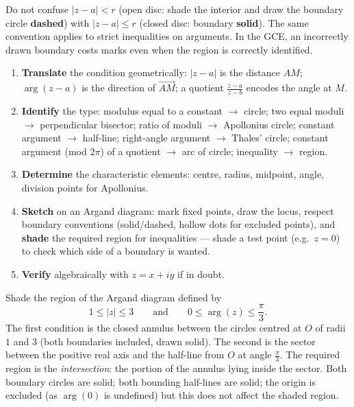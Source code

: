 \documentclass[11pt]{article}
\begin{document}
\begin{attention}
Do not confuse $|z - a| < r$ (open disc: shade the interior and draw the boundary circle \textbf{dashed}) with $|z - a| \leq r$ (closed disc: boundary \textbf{solid}). The same convention applies to strict inequalities on arguments. In the GCE, an incorrectly drawn boundary costs marks even when the region is correctly identified.
\end{attention}

\begin{methode}
\begin{enumerate}
\item \textbf{Translate} the condition geometrically: $|z - a|$ is the distance $AM$; $\arg(z - a)$ is the direction of $\overrightarrow{AM}$; a quotient $\tfrac{z - a}{z - b}$ encodes the angle at $M$.
\item \textbf{Identify} the type: modulus equal to a constant $\to$ circle; two equal moduli $\to$ perpendicular bisector; ratio of moduli $\to$ Apollonius circle; constant argument $\to$ half-line; right-angle argument $\to$ Thales' circle; constant argument (mod $2\pi$) of a quotient $\to$ arc of circle; inequality $\to$ region.
\item \textbf{Determine} the characteristic elements: centre, radius, midpoint, angle, division points for Apollonius.
\item \textbf{Sketch} on an Argand diagram: mark fixed points, draw the locus, respect boundary conventions (solid/dashed, hollow dots for excluded points), and \textbf{shade} the required region for inequalities — shade a test point (e.g.\ $z = 0$) to check which side of a boundary is wanted.
\item \textbf{Verify} algebraically with $z = x + iy$ if in doubt.
\end{enumerate}
\end{methode}

\begin{exoresolu}
Shade the region of the Argand diagram defined by
\[ 1 \leq |z| \leq 3 \qquad \text{and} \qquad 0 \leq \arg(z) \leq \frac{\pi}{3}. \]
\tcblower
The first condition is the closed annulus between the circles centred at $O$ of radii $1$ and $3$ (both boundaries included, drawn solid). The second is the sector between the positive real axis and the half-line from $O$ at angle $\tfrac{\pi}{3}$. The required region is the \emph{intersection}: the portion of the annulus lying inside the sector. Both boundary circles are solid; both bounding half-lines are solid; the origin is excluded (as $\arg(0)$ is undefined) but this does not affect the shaded region.
\end{exoresolu}
\end{document}
